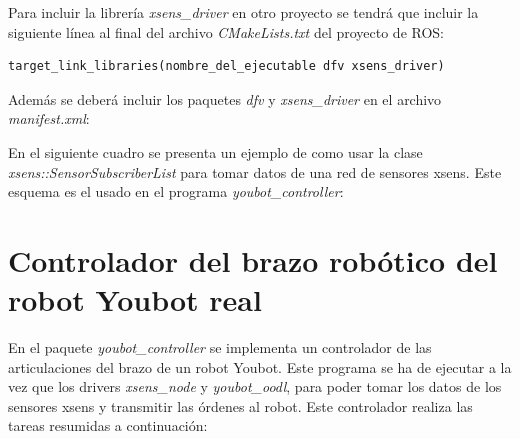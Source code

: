 \documentclass[12pt, a4paper]{report}
\begin{document}
Para incluir la librería \textit{xsens\_driver} en otro proyecto se tendrá que incluir la siguiente línea al final del archivo \textit{CMakeLists.txt} del proyecto de ROS:

\begin{lstlisting}
target_link_libraries(nombre_del_ejecutable dfv xsens_driver)
\end{lstlisting}

Además se deberá incluir los paquetes \textit{dfv} y \textit{xsens\_driver} en el archivo \textit{manifest.xml}:

\lstset{inputencoding=utf8/latin1}


En el siguiente cuadro se presenta un ejemplo de como usar la clase \textit{xsens::SensorSubscriberList} para tomar datos de una red de sensores xsens. Este esquema es el usado en el programa \textit{youbot\_controller}:

\lstset{inputencoding=utf8/latin1}


\section{Controlador del brazo robótico del robot Youbot real}

En el paquete \textit{youbot\_controller} se implementa un controlador de las articulaciones del brazo de un robot Youbot. Este programa se ha de ejecutar a la vez que los drivers \textit{xsens\_node} y \textit{youbot\_oodl}, para poder tomar los datos de los sensores xsens y transmitir las órdenes al robot. Este controlador realiza las tareas resumidas a continuación:
\end{document}
